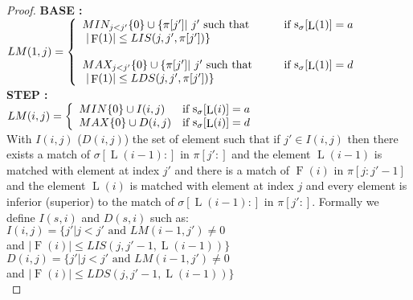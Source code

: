 \documentclass[a4paper]{llncs}
\newcommand{\ptext}{\pi}
\newcommand{\pmotif}{\sigma}
\DeclareMathOperator{\stripea}{s}
\newcommand{\stripe}[2]{\stripea_{{#1}}[{#2}]}
\newcommand{\dstep}{d}
\newcommand{\ustep}{a}
\DeclareMathOperator{\firsta}{L}
\newcommand{\first}[1]{\firsta({#1})}
\DeclareMathOperator{\factora}{F}
\newcommand{\factor}[1]{\factora({#1})}
\begin{document}
\begin{proof}
\textbf{BASE :} \\
$LM(1,j)= \left\{ 
	\begin{array}{l l}
	
		MIN_{j<j'}\{0\} \cup \{\ptext[j'] |\text{ $j'$ such that \indent } & 
		\text{if $\stripe{\pmotif}{\first{1}}=\ustep$}\\
		\text{ $|\factor{1}| \leq LIS(j,j',\ptext[j'])  $}\}&\\			
	
	
		&\\
		
		MAX_{j<j'}\{0\} \cup \{\ptext[j'] |\text{ $j'$ such that \indent } &
		\text{if $\stripe{\pmotif}{\first{1}}=\dstep$} \\
		\text{ $|\factor{1}| \leq LDS(j,j',\ptext[j']) $}\}&\\			
	
	\end{array} \right. $\\	

\textbf{STEP :} \\
$LM(i,j)= \left\{ 
	\begin{array}{l l}
	
		MIN \{0\} \cup  I(i,j) & 
		\text{if $\stripe{\pmotif}{\first{i}}=\ustep$}\\

		
		MAX \{0\} \cup  D(i,j) & 
		\text{if $\stripe{\pmotif}{\first{i}}=\dstep$}\\

		
							
	\end{array} \right. $\\
					
With $I(i,j)$ ($D(i,j)$) the set of element such that
if  $j' \in I(i,j)$ then there exists 
a match of $\pmotif[\first{i-1}:]$ in $\ptext[j':]$ and
the element $\first{i-1}$ is matched with element at index $j'$ and
there is a match of $\factor{i}$ in $\ptext[j:j'-1]$ and
the element $\first{i}$ is matched with element at index $j$ and every element is inferior (superior) to the match of  
$\pmotif[\first{i-1}:]$ in $\ptext[j':]$.
Formally we define $I(s,i)$ and $D(s,i)$ such as:\\
			
$I(i,j)=\{j'|\text{$j<j'$ and $LM(i-1,j')\neq 0$}$ \\
\indent \indent \indent and  $|\factor{i}| \leq LIS(j,j'-1,\first{i-1})\}$ \\

$D(i,j)=\{j'|\text{$j<j'$ and $LM(i-1,j')\neq 0$}$ \\
\indent \indent \indent and  $|\factor{i}| \leq LDS(j,j'-1,\first{i-1}) \}$ \\
					                       

\end{proof}
\end{document}
